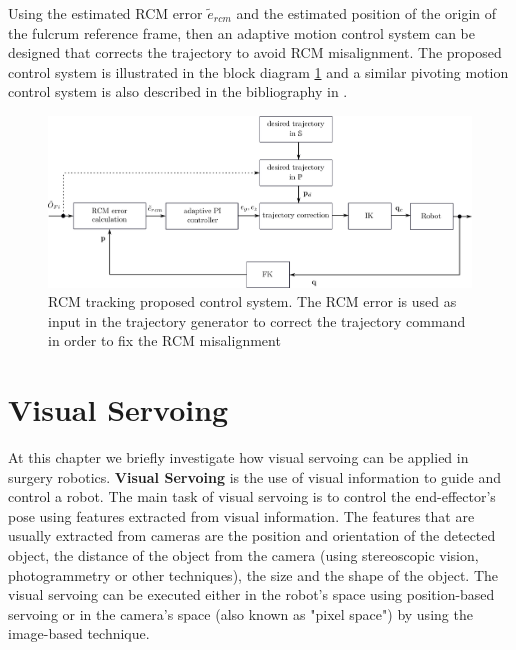 Using the estimated RCM error $\tilde{e}_{rcm}$ and the estimated position of the origin of the fulcrum reference frame, then an adaptive motion control system can be designed that corrects the trajectory to avoid RCM 
misalignment. The proposed control system is illustrated in the block diagram \ref{rcm-control-system-block-diagram} and a similar pivoting motion control system is also described in the bibliography 
in \cite{Muoz2005PivotingMC}.

\begin{center}
\begin{figure}[!htb]
\centering
\includegraphics[width=\textwidth]{images/rcm-system-control.png}
\caption{RCM tracking proposed control system. The RCM error is used as input in the trajectory generator to correct the trajectory command in order to fix the RCM misalignment}
\label{rcm-control-system-block-diagram}
\end{figure}
\end{center}


\section{Visual Servoing}

At this chapter we briefly investigate how visual servoing can be applied in surgery robotics. \textbf{Visual Servoing} is the use of visual information 
to guide and control a robot. The main task of visual servoing is to control the end-effector's pose using features extracted from visual information. The 
features that are usually extracted from cameras are the position and orientation of the detected object, the distance of the object from the camera (using 
stereoscopic vision, photogrammetry or other techniques), the size and the shape of the object. The visual servoing can be executed either in the robot's space 
using position-based servoing or in the camera's space (also known as "pixel space") by using the image-based technique.

